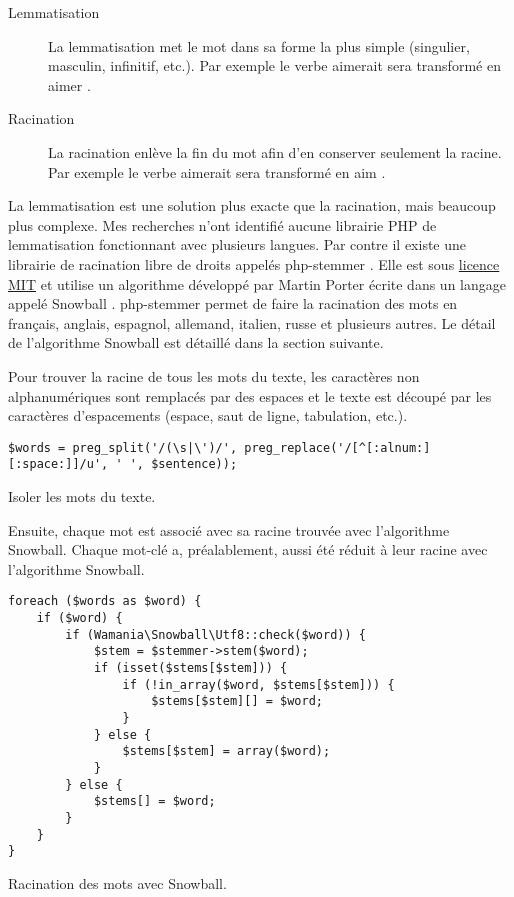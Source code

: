 \begin{description}
  \item[Lemmatisation]
  
  La lemmatisation met le mot dans sa forme la plus simple (singulier, masculin, infinitif, etc.).
  Par exemple le verbe \og aimerait \fg{} sera transformé en \og aimer \fg{}.
  
  \item[Racination]
  
  La racination enlève la fin du mot afin d'en conserver seulement la racine.
  Par exemple le verbe \og aimerait \fg{} sera transformé en \og aim \fg{}.
\end{description}

La lemmatisation est une solution plus exacte que la racination, mais beaucoup plus complexe.
Mes recherches n'ont identifié aucune librairie PHP de lemmatisation fonctionnant avec plusieurs langues.
Par contre il existe une librairie de racination libre de droits appelés php-stemmer \cite{phpstemmer}.
Elle est sous \href{https://raw.githubusercontent.com/wamania/php-stemmer/master/LICENSE}{licence MIT} et utilise un algorithme développé par Martin Porter écrite dans un langage appelé Snowball \cite{snowball}.
php-stemmer permet de faire la racination des mots en français, anglais, espagnol, allemand, italien, russe et plusieurs autres.
Le détail de l'algorithme Snowball est détaillé dans la section suivante.

Pour trouver la racine de tous les mots du texte, les caractères non alphanumériques sont remplacés par des espaces et le texte est découpé par les caractères d'espacements (espace, saut de ligne, tabulation, etc.).

\begin{lstfloat}
\begin{lstlisting}[frame=l]
$words = preg_split('/(\s|\')/', preg_replace('/[^[:alnum:][:space:]]/u', ' ', $sentence));
\end{lstlisting}
\caption{Isoler les mots du texte.}
\label{code:commentaire}
\end{lstfloat}

Ensuite, chaque mot est associé avec sa racine trouvée avec l'algorithme Snowball.
Chaque mot-clé a, préalablement, aussi été réduit à leur racine avec l'algorithme Snowball.

\begin{lstfloat}
\begin{lstlisting}[frame=l]
foreach ($words as $word) {
	if ($word) {
		if (Wamania\Snowball\Utf8::check($word)) {
			$stem = $stemmer->stem($word);
			if (isset($stems[$stem])) {
				if (!in_array($word, $stems[$stem])) {
					$stems[$stem][] = $word;
				}
			} else {
				$stems[$stem] = array($word);
			}
		} else {
			$stems[] = $word;
		}
	}
}
\end{lstlisting}
\caption{Racination des mots avec Snowball.}
\label{code:racinationsnowball}
\end{lstfloat}

